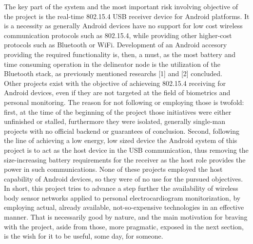 		The key part of the system and the most important risk involving objective of the project is the real-time 802.15.4 USB receiver device for Android platforms. It is a necessity as generally Android devices have no support for low cost wireless communication protocols such as 802.15.4, while providing other higher-cost protocols such as Bluetooth or WiFi. Development of an Android accesory providing the required functionality is, then, a must, as the most battery and time consuming operation in the delineator node is the utilization of the Bluetooth stack, as previously mentioned researchs [1] and [2] concluded.\\

		Other projects exist with the objective of achieveing 802.15.4 receiving for Android devices, even if they are not targeted at the field of biometrics and personal monitoring. The reason for not following or employing those is twofold: 
		first, at the time of the beginning of the project those initiatives were either unfinished or stalled, furthermore they were isolated, generally single-man projects with no official backend or guarantees of conclusion.
		Second, following the line of achieving a low energy, low sized device the Android system of this project is to act as the host device in the USB communication, thus removing the size-increasing battery requirements for the receiver as the host role provides the power in such communications. None of these projects employed the host capability of Android devices, so they were of no use for the pursued objectives.\\

		In short, this project tries to advance a step further the availability of wireless body sensor networks applied to personal electrocardiogram monitorization, by employing actual, already available, not-so-expensive technologies in an effective manner. That is necessarily good by nature, and the main motivation for braving with the project, aside from those, more pragmatic, exposed in the next section, is the wish for it to be useful, some day, for someone.

